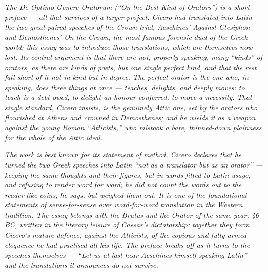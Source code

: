 
\textit{The \textit{De Optimo Genere Oratorum} (``On the Best Kind
of Orators'') is a short preface --- all that survives of a larger
project. Cicero had translated into Latin the two great paired
speeches of the Crown trial, Aeschines' \textit{Against Ctesiphon}
and Demosthenes' \textit{On the Crown}, the most famous forensic
duel of the Greek world; this essay was to introduce those
translations, which are themselves now lost. Its central argument
is that there are not, properly speaking, many ``kinds'' of orators,
as there are kinds of poets, but one single perfect kind, and that
the rest fall short of it not in kind but in degree. The perfect
orator is the one who, in speaking, does three things at once ---
teaches, delights, and deeply moves: to teach is a debt owed, to
delight an honour conferred, to move a necessity. That single
standard, Cicero insists, is the genuinely Attic one, set by the
orators who flourished at Athens and crowned in Demosthenes; and
he wields it as a weapon against the young Roman ``Atticists,'' who
mistook a bare, thinned-down plainness for the whole of the Attic
ideal.}

\textit{The work is best known for its statement of method. Cicero
declares that he turned the two Greek speeches into Latin ``not as
a translator but as an orator'' --- keeping the same thoughts and
their figures, but in words fitted to Latin usage, and refusing to
render word for word; he did not count the words out to the reader
like coins, he says, but weighed them out. It is one of the
foundational statements of sense-for-sense over word-for-word
translation in the Western tradition. The essay belongs with the
\textit{Brutus} and the \textit{Orator} of the same year, 46 BC,
written in the literary leisure of Caesar's dictatorship: together
they form Cicero's mature defence, against the Atticists, of the
copious and fully armed eloquence he had practised all his life.
The preface breaks off as it turns to the speeches themselves ---
``Let us at last hear Aeschines himself speaking Latin'' --- and the
translations it announces do not survive.}
